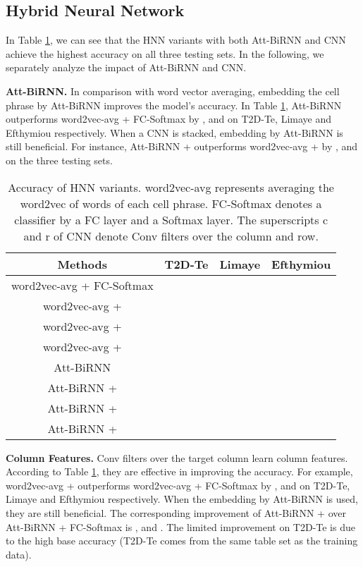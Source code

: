 \documentclass{article}
\begin{document}
\subsection{Hybrid Neural Network}
In Table \ref{res:hnn}, we can see that the HNN variants with both Att-BiRNN and CNN achieve the highest accuracy on all three testing sets.
In the following, we separately analyze the impact of Att-BiRNN and CNN.


\vspace{0.1cm}
\noindent \textbf{Att-BiRNN.}
In comparison with word vector averaging, embedding the cell phrase by Att-BiRNN improves the model's accuracy.
In Table \ref{res:hnn}, Att-BiRNN outperforms word2vec-avg + FC-Softmax by ,  and  on T2D-Te, Limaye and Efthymiou respectively.
When a CNN is stacked,
embedding by Att-BiRNN is still beneficial. 
For instance, Att-BiRNN + 
outperforms word2vec-avg +  by ,  and  on the three testing sets.


\begin{table}[h!]
\scriptsize{
\centering
\begin{tabular}[t]{c|c|c|c}
\hline
Methods & T2D-Te & Limaye & Efthymiou    \\\hline 
word2vec-avg + FC-Softmax &   &  &  \\\hline
word2vec-avg +  &   &  &   \\
word2vec-avg +  &   &  &  \\
word2vec-avg +  &  &  &   \\\hline\hline
Att-BiRNN &  &  &  \\\hline
Att-BiRNN +  &  &  &   \\
Att-BiRNN +  &  &  &   \\
Att-BiRNN +  &  &   &  \\\hline
\end{tabular}
\vspace{-0.2cm}
\caption{\footnotesize
\label{res:hnn}
Accuracy of HNN variants. 
word2vec-avg represents averaging the word2vec of words of each cell phrase.
FC-Softmax denotes a classifier by a FC layer and a Softmax layer.
The superscripts c and r of CNN denote Conv filters over the column and row.
}
}
\end{table}
\vspace{-0.2cm}

\noindent \textbf{Column Features.}
Conv filters over the target column learn column features.
According to Table \ref{res:hnn}, they are effective in improving the accuracy.  
For example, word2vec-avg +  outperforms word2vec-avg + FC-Softmax  
by ,  and  on T2D-Te, Limaye and Efthymiou respectively.
When the embedding by Att-BiRNN is used, 
they are still beneficial. 
The corresponding improvement of Att-BiRNN +  over Att-BiRNN + FC-Softmax is ,  and .
The limited improvement on T2D-Te is due to the high base accuracy (T2D-Te comes from the same table set as the training data).
\end{document}
